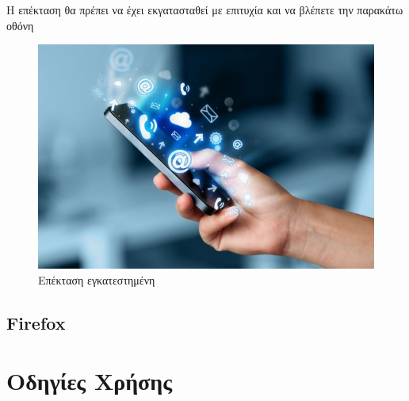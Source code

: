 \documentclass{article}
\begin{document}
Η επέκταση θα πρέπει να έχει εκγατασταθεί με επιτυχία και να βλέπετε την παρακάτω οθόνη
\begin{figure}[H]
    \includegraphics[width=\textwidth]{logo}
    \caption*{Επέκταση εγκατεστημένη}
\end{figure}

\subsection*{Firefox}
\section*{Οδηγίες Χρήσης}
\end{document}
